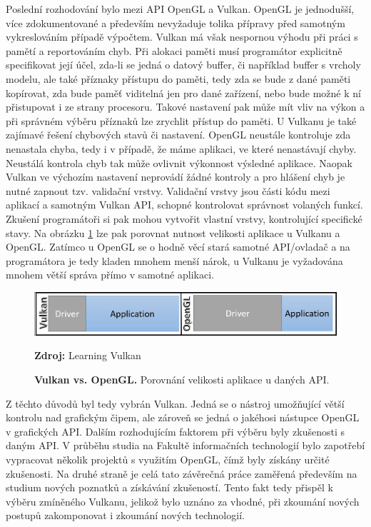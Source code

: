 Poslední rozhodování bylo mezi API OpenGL a Vulkan. OpenGL je jednodušší, více zdokumentované a především nevyžaduje tolika přípravy před samotným vykreslováním případě výpočtem. Vulkan má však nespornou výhodu při práci s pamětí a reportováním chyb. Při alokaci paměti musí programátor explicitně specifikovat její účel, zda-li se jedná o datový buffer, či například buffer s vrcholy modelu, ale také příznaky přístupu do paměti, tedy zda se bude z dané paměti kopírovat, zda bude paměť viditelná jen pro dané zařízení, nebo bude možné k ní přistupovat i ze strany procesoru. Takové nastavení pak může mít vliv na výkon a při správném výběru příznaků lze zrychlit přístup do paměti. U Vulkanu je také zajímavé řešení chybových stavů či nastavení. OpenGL neustále kontroluje zda nenastala chyba, tedy i v případě, že máme aplikaci, ve které nenastávají chyby. Neustálá kontrola chyb tak může ovlivnit výkonnost výsledné aplikace. Naopak Vulkan ve výchozím nastavení neprovádí žádné kontroly a pro hlášení chyb je nutné zapnout tzv. validační vrstvy. Validační vrstvy jsou části kódu mezi aplikací a samotným Vulkan API, schopné kontrolovat správnost volaných funkcí. Zkušení programátoři si pak mohou vytvořit vlastní vrstvy, kontrolující specifické stavy. Na obrázku \ref{fig:VulXogl} lze pak porovnat nutnost velikosti aplikace u Vulkanu a OpenGL. Zatímco u OpenGL se o hodně věcí stará samotné API/ovladač a na programátora je tedy kladen mnohem menší nárok, u Vulkanu je vyžadována mnohem větší správa přímo v samotné aplikaci. \cite{singh2016learning} \cite{VulkanTut}

\begin{figure}[hbt]
	\centering
	\captionsetup{justification=centering}
	\includegraphics[scale=0.6]{obrazky-figures/vulkanXogl.jpg}
	\caption{\textbf{Vulkan vs. OpenGL.} Porovnání velikosti aplikace u daných API. }
	\textbf{Zdroj: } Learning Vulkan \cite{singh2016learning}
	\label{fig:VulXogl}
\end{figure}

Z těchto důvodů byl tedy vybrán Vulkan. Jedná se o nástroj umožňující větší kontrolu nad grafickým čipem, ale zároveň se jedná o jakéhosi nástupce OpenGL v grafických API. Dalším rozhodujícím faktorem při výběru byly zkušenosti s daným API. V průběhu studia na Fakultě informačních technologií bylo zapotřebí vypracovat několik projektů s využitím OpenGL, čímž byly získány určité zkušenosti. Na druhé straně je celá tato závěrečná práce zaměřená především na studium nových poznatků a získávání zkušeností. Tento fakt tedy přispěl k výběru zmíněného Vulkanu, jelikož bylo uznáno za vhodné, při zkoumání nových postupů zakomponovat i zkoumání nových technologií.


